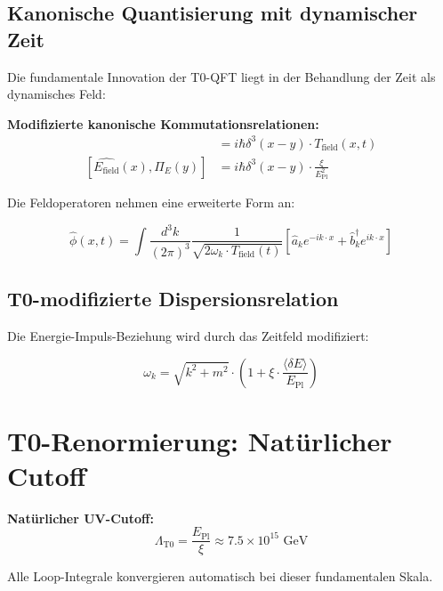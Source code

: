 \documentclass[12pt,a4paper]{article}
\newcommand{\Efield}{E_{\text{field}}}
\newcommand{\xipar}{\xi}
\newcommand{\deltaE}{\delta E}
\newcommand{\EPlanck}{E_{\text{Pl}}}
\begin{document}
	\subsection{Kanonische Quantisierung mit dynamischer Zeit}
	
	Die fundamentale Innovation der T0-QFT liegt in der Behandlung der Zeit als dynamisches Feld:
	
	\begin{tcolorbox}[colback=green!5!white,colframe=green!75!black,title=T0-Kanonische Quantisierung]
		\textbf{Modifizierte kanonische Kommutationsrelationen:}
		\begin{align}
			[\hat{\phi}(x), \hat{\pi}(y)] &= i\hbar \delta^3(x-y) \cdot T_{\text{field}}(x,t) \\
			[\hat{\Efield}(x), \hat{\Pi}_E(y)] &= i\hbar \delta^3(x-y) \cdot \frac{\xipar}{\EPlanck^2}
		\end{align}
	\end{tcolorbox}
	
	Die Feldoperatoren nehmen eine erweiterte Form an:
	
	\begin{equation}
		\hat{\phi}(x,t) = \int \frac{d^3k}{(2\pi)^3} \frac{1}{\sqrt{2\omega_k \cdot T_{\text{field}}(t)}} \left[\hat{a}_k e^{-ik \cdot x} + \hat{b}^\dagger_k e^{ik \cdot x}\right]
	\end{equation}
	
	\subsection{T0-modifizierte Dispersionsrelation}
	
	Die Energie-Impuls-Beziehung wird durch das Zeitfeld modifiziert:
	
	\begin{equation}
		\boxed{\omega_k = \sqrt{k^2 + m^2} \cdot \left(1 + \xipar \cdot \frac{\langle\deltaE\rangle}{\EPlanck}\right)}
	\end{equation}
	
	\section{T0-Renormierung: Natürlicher Cutoff}
	
	\begin{tcolorbox}[colback=red!5!white,colframe=red!75!black,title=T0-Renormierung]
		\textbf{Natürlicher UV-Cutoff:}
		\begin{equation}
			\Lambda_{\text{T0}} = \frac{\EPlanck}{\xipar} \approx 7.5 \times 10^{15} \text{ GeV}
		\end{equation}
		
		Alle Loop-Integrale konvergieren automatisch bei dieser fundamentalen Skala.
	\end{tcolorbox}
	
\end{document}
